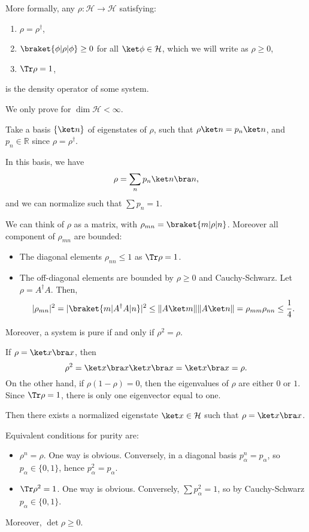 \documentclass[12pt]{article}
\begin{document}
More formally, any $\rho : \mathcal{H} \to \mathcal{H}$ satisfying:
\begin{enumerate}
	\item $\rho = \rho^{\dagger}$,
	\item $\braket{\phi | \rho | \phi} \geq 0$ for all $\ket \phi \in \mathcal{H}$, which we will write as $\rho \geq 0$,
	\item $\Tr \rho = 1$,
\end{enumerate}
is the density operator of some system.
\begin{proofbox}
	We only prove for $\dim \mathcal{H} < \infty$.

	Take a basis $\{ \ket n \}$ of eigenstates of $\rho$, such that $\rho \ket n = p_n \ket n$, and $p_n \in \mathbb{R}$ since $\rho = \rho^{\dagger}$.

	In this basis, we have
	\[
	\rho = \sum_n p_n \ket n \bra n,
	\]
	and we can normalize such that $\sum p_n = 1$.
\end{proofbox}
We can think of $\rho$ as a matrix, with $\rho_{mn} = \braket{m|\rho|n}$. Moreover all component of $\rho_{mn}$ are bounded:
\begin{itemize}
	\item The diagonal elements $\rho_{nn} \leq 1$ as $\Tr \rho = 1$.
	\item The off-diagonal elements are bounded by $\rho \geq 0$ and Cauchy-Schwarz. Let $\rho = A^{\dagger} A$. Then,
		\[
			|\rho_{mn}|^2 = |\braket{m|A^{\dagger}A|n}|^2 \leq \|A\ket m\| \|A \ket n\| = \rho_{mm} \rho_{nn} \leq \frac{1}{4}.
		\]
\end{itemize}
Moreover, a system is pure if and only if $\rho^2 = \rho$.
\begin{proofbox}
	If $\rho = \ket x \bra x$, then
	\[
	\rho^2 = \ket x \bra x \ket x \bra x = \ket x \bra x = \rho.
	\]
	On the other hand, if $\rho(1 - \rho) = 0$, then the eigenvalues of $\rho$ are either $0$ or $1$. Since $\Tr \rho = 1$, there is only one eigenvector equal to one.

	Then there exists a normalized eigenstate $\ket x \in \mathcal{H}$ such that $\rho = \ket x \bra x$.
\end{proofbox}
Equivalent conditions for purity are:
\begin{itemize}
	\item $\rho^{n} = \rho$. One way is obvious. Conversely, in a diagonal basis $p_\alpha^{n} = p_\alpha$, so $p_\alpha \in \{0, 1\}$, hence $p_\alpha^2 = p_\alpha$.
	\item $\Tr \rho^2 = 1$. One way is obvious. Conversely, $\sum p_\alpha^2 = 1$, so by Cauchy-Schwarz $p_\alpha \in \{0, 1\}$.
\end{itemize}
Moreover, $\det \rho \geq 0$.
\end{document}
